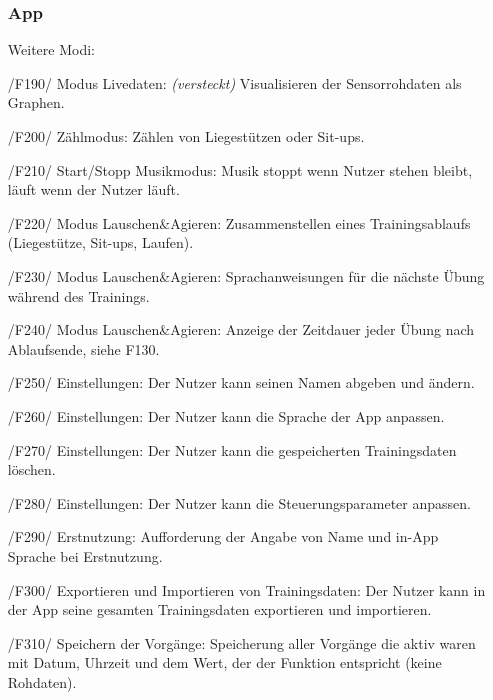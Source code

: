 \documentclass[a4paper,12pt]{article}
\begin{document}
\begin{itemize}
    \subsubsection{App}
      Weitere Modi:
      \item[/F190/] \textsf{Modus Livedaten: \textit{(versteckt)}} Visualisieren der Sensorrohdaten als Graphen.    
      \item[/F200/] \textsf{Zählmodus:} Zählen von Liegestützen oder Sit-ups. %
      \item[/F210/] \textsf{Start/Stopp Musikmodus:} Musik stoppt wenn Nutzer stehen bleibt, läuft wenn der Nutzer läuft.
      \item[/F220/] \textsf{Modus Lauschen\&Agieren:} Zusammenstellen eines Trainingsablaufs (Liegestütze, Sit-ups, Laufen). 
      \item[/F230/] \textsf {Modus Lauschen\&Agieren:} Sprachanweisungen für die nächste Übung während des Trainings.
      \item[/F240/] \textsf {Modus Lauschen\&Agieren:} Anzeige der Zeitdauer jeder Übung nach Ablaufsende, siehe F130.
      \item[/F250/] \textsf {Einstellungen:} Der Nutzer kann seinen Namen abgeben und ändern.
      \item[/F260/] \textsf {Einstellungen:} Der Nutzer kann die Sprache der App anpassen.
      \item[/F270/] \textsf {Einstellungen:} Der Nutzer kann die gespeicherten Trainingsdaten löschen.
      \item[/F280/] \textsf {Einstellungen:} Der Nutzer kann die Steuerungsparameter anpassen. %
      \item[/F290/] \textsf {Erstnutzung:} Aufforderung der Angabe von Name und in-App Sprache bei Erstnutzung.
      \item[/F300/] \textsf{Exportieren und Importieren von Trainingsdaten:} Der Nutzer kann in der App seine gesamten Trainingsdaten exportieren und importieren.
      \item[/F310/] \textsf{Speichern der Vorgänge:} Speicherung aller Vorgänge die aktiv waren mit Datum, Uhrzeit und dem Wert, der der Funktion entspricht (keine Rohdaten).   %
    \end{itemize}
\end{document}
